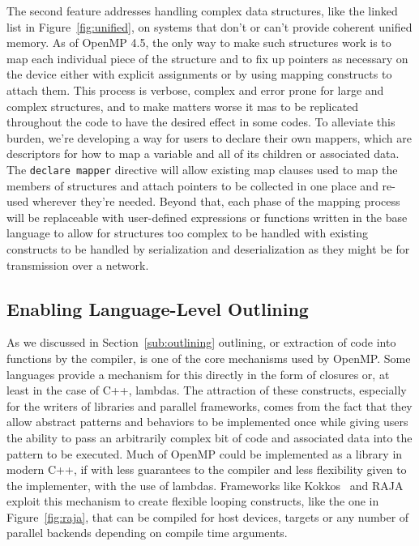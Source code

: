 The second feature addresses handling complex data structures, like the linked
list in Figure~\ref{fig:unified}, on systems that don't or can't provide
coherent unified memory.  As of OpenMP 4.5, the only way to make such structures
work is to map each individual piece of the structure and to fix up pointers as
necessary on the device either with explicit assignments or by using mapping
constructs to attach them.  This process is verbose, complex and error prone for
large and complex structures, and to make matters worse it mas to be replicated
throughout the code to have the desired effect in some codes.  To alleviate this
burden, we're developing a way for users to declare their own mappers, which are
descriptors for how to map a variable and all of its children or associated
data.  The \texttt{declare mapper} directive will allow existing map clauses
used to map the members of structures and attach pointers to be collected in
one place and re-used wherever they're needed.  Beyond that, each phase of the
mapping process will be replaceable with user-defined expressions or functions
written in the base language to allow for structures too complex to be handled
with existing constructs to be handled by serialization and deserialization as
they might be for transmission over a network.


\subsection{Enabling Language-Level Outlining}
\label{sub:enabling_language_level_outlining}

As we discussed in Section~\ref{sub:outlining} outlining, or extraction of code
into functions by the compiler, is one of the core mechanisms used by OpenMP.
Some languages provide a mechanism for this directly in the form of closures or,
at least in the case of C++, lambdas.  The attraction of these constructs,
especially for the writers of libraries and parallel frameworks, comes from the
fact that they allow abstract patterns and behaviors to be implemented once
while giving users the ability to pass an arbitrarily complex bit of code and
associated data into the pattern to be executed.  Much of OpenMP could be
implemented as a library in modern C++, if with less guarantees to the compiler
and less flexibility given to the implementer, with the use of lambdas.
Frameworks like Kokkos~\cite{kokkos} and RAJA~\cite{raja} exploit this mechanism
to create flexible looping constructs, like the one in Figure~\ref{fig:raja},
that can be compiled for host devices, targets or any number of parallel
backends depending on compile time arguments.

